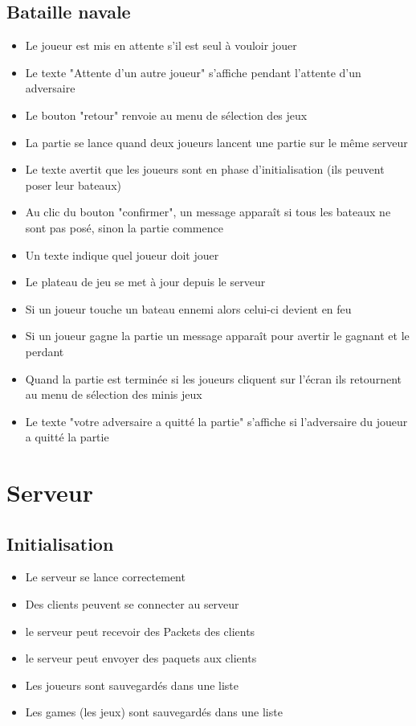 \documentclass{report}
\begin{document}
\subsection{Bataille navale}
\begin{itemize}
  \item Le joueur est mis en attente s'il est seul à vouloir jouer
  \item Le texte "Attente d'un autre joueur" s'affiche pendant l'attente d'un adversaire
  \item Le bouton "retour" renvoie au menu de sélection des jeux
  \item La partie se lance quand deux joueurs lancent une partie sur le même serveur
  \item Le texte avertit que les joueurs sont en phase d'initialisation (ils peuvent poser leur bateaux)
  \item Au clic du bouton "confirmer", un message apparaît si tous les bateaux ne sont pas posé, sinon la partie commence
  \item Un texte indique quel joueur doit jouer
  \item Le plateau de jeu se met à jour depuis le serveur
  \item Si un joueur touche un bateau ennemi alors celui-ci devient en feu
  \item Si un joueur gagne la partie un message apparaît pour avertir le gagnant et le perdant
  \item Quand la partie est terminée si les joueurs cliquent sur l'écran ils retournent au menu de sélection des minis jeux
  \item Le texte "votre adversaire a quitté la partie" s'affiche si l'adversaire du joueur a quitté la partie
\end{itemize}

\section{Serveur}

\subsection{Initialisation}
\begin{itemize}
  \item Le serveur se lance correctement
  \item Des clients peuvent se connecter au serveur
  \item le serveur peut recevoir des Packets des clients
  \item le serveur peut envoyer des paquets aux clients
  \item Les joueurs sont sauvegardés dans une liste
  \item Les games (les jeux) sont sauvegardés dans une liste
\end{itemize}
\end{document}
